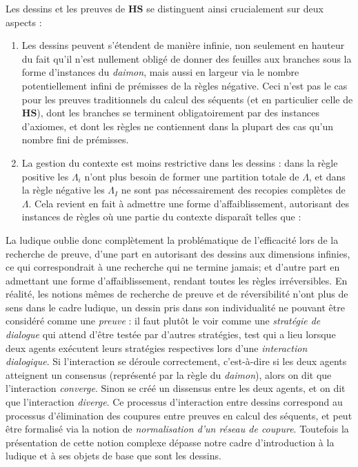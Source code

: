\documentclass[12pt]{report}
\newcommand{\seq}{\vdash}
\newcommand{\irule}[1]{\footnotesize$#1$}
\begin{document}
Les dessins et les preuves de $\mathbf{HS}$ se distinguent ainsi crucialement sur deux aspects :
\begin{enumerate}
	\item Les dessins peuvent s'étendent de manière infinie, non seulement en hauteur du fait qu'il n'est nullement obligé de donner des feuilles aux branches sous la forme d'instances du \textit{daimon}, mais aussi en largeur via le nombre potentiellement infini de prémisses de la règles négative. Ceci n'est pas le cas pour les preuves traditionnels du calcul des séquents (et en particulier celle de $\mathbf{HS}$), dont les branches se terminent obligatoirement par des instances d'axiomes, et dont les règles ne contiennent dans la plupart des cas qu'un nombre fini de prémisses.
	\item La gestion du contexte est moins restrictive dans les dessins : dans la règle positive les $\Lambda_i$ n'ont plus besoin de former une partition totale de $\Lambda$, et dans la règle négative les $\Lambda_I$ ne sont pas nécessairement des recopies complètes de $\Lambda$. Cela revient en fait à admettre une forme d'affaiblissement, autorisant des instances de règles où une partie du contexte disparaît telles que :\\
	\begin{longtabu}{>{$}c<{$}>{$}c<{$}}
		\prftree[r]{\irule{\xi,\{1,2\}}}
		{\xi \ast 1 \seq \alpha}
		{\xi \ast 2 \seq \beta}
		{\seq \xi,\alpha,\beta,\gamma} &
		\prftree[r]{\irule{\xi,\{\{1,2\},\{1,3\}\}}}
		{\seq \xi \ast \{1,2\},\alpha,\beta}
		{\seq \xi \ast \{1,3\},\alpha}
		{\xi \seq \alpha,\beta,\gamma}
	\end{longtabu}
\end{enumerate}

La ludique oublie donc complètement la problématique de l'efficacité lors de la recherche de preuve, d'une part en autorisant des dessins aux dimensions infinies, ce qui correspondrait à une recherche qui ne termine jamais; et d'autre part en admettant une forme d'affaiblissement, rendant toutes les règles irréversibles. En réalité, les notions mêmes de recherche de preuve et de réversibilité n'ont plus de sens dans le cadre ludique, un dessin pris dans son individualité ne pouvant être considéré comme une \emph{preuve} : il faut plutôt le voir comme une \emph{stratégie de dialogue} qui attend d'être testée par d'autres stratégies, test qui a lieu lorsque deux agents exécutent leurs stratégies respectives lors d'une \emph{interaction dialogique}. Si l'interaction se déroule correctement, c'est-à-dire si les deux agents atteignent un consensus (représenté par la règle du \textit{daimon}), alors on dit que l'interaction \emph{converge}. Sinon se créé un dissensus entre les deux agents, et on dit que l'interaction \emph{diverge}. Ce processus d'interaction entre dessins correspond au processus d'élimination des coupures entre preuves en calcul des séquents, et peut être formalisé via la notion de \emph{normalisation d'un réseau de coupure}. Toutefois la présentation de cette notion complexe dépasse notre cadre d'introduction à la ludique et à ses objets de base que sont les dessins.\\
\end{document}
